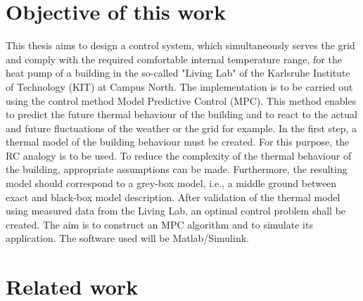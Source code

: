 \section{Objective of this work}
\label{section:obejective}
    This thesis aims to design a control system, which simultaneously serves the grid and comply with the required comfortable internal temperature range, for the heat pump of a building in the so-called "Living Lab" of the Karlsruhe Institute of Technology (KIT) at Campus North. The implementation is to be carried out using the control method Model Predictive Control (MPC). This method enables to predict the future thermal behaviour of the building and to react to the actual and future fluctuations of the weather or the grid for example. 
    In the first step, a thermal model of the building behaviour must be created. For this purpose, the RC analogy is to be used. To reduce the complexity of the thermal behaviour of the building, appropriate assumptions can be made. Furthermore, the resulting model should correspond to a grey-box model, i.e., a middle ground between exact and black-box model description. After validation of the thermal model using measured data from the Living Lab, an optimal control problem shall be created. The aim is to construct an MPC algorithm and to simulate its application. The software used will be Matlab/Simulink.

\section{Related work}
\label{section:relatedwork}

